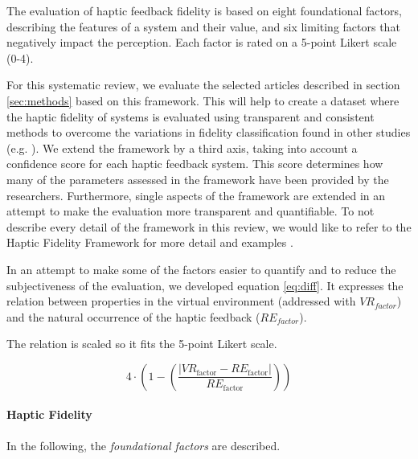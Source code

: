 The evaluation of haptic feedback fidelity is based on eight foundational factors, describing the features of a system and their value, and six limiting factors that negatively impact the perception. Each factor is rated on a 5-point Likert scale (0-4). 

For this systematic review, we evaluate the selected articles described in section \ref{sec:methods}  based on this framework. This will help to create a dataset where the haptic fidelity of systems is evaluated using transparent and consistent methods to overcome the variations in fidelity classification found in other studies (e.g. \cite{Yang2023, Grant2019}). We extend the framework by a third axis, taking into account a confidence score for each haptic feedback system. This score determines how many of the parameters assessed in the framework have been provided by the researchers. Furthermore, single aspects of the framework are extended in an attempt to make the evaluation more transparent and quantifiable. 
To not describe every detail of the framework in this review, we would like to refer to the Haptic Fidelity Framework for more detail and examples \cite{Muender2022HapticReality}.

In an attempt to make some of the factors easier to quantify and to reduce the subjectiveness of the evaluation, we developed equation \ref{eq:diff}. It expresses the relation between properties in the virtual environment (addressed with $VR_{factor}$) and the natural occurrence of the haptic feedback ($RE_{factor}$). 

The relation is scaled so it fits the 5-point Likert scale.

\begin{equation}    
4 \cdot \left(1 - \left(\frac{\left|VR_{\text{factor}} - RE_{\text{factor}}\right|}{RE_{\text{factor}}}\right)\right)
\label{eq:diff}
\end{equation}



\paragraph{Haptic Fidelity}
\label{sec:foundationallimiting}

In the following, the \textit{foundational factors} are described.

